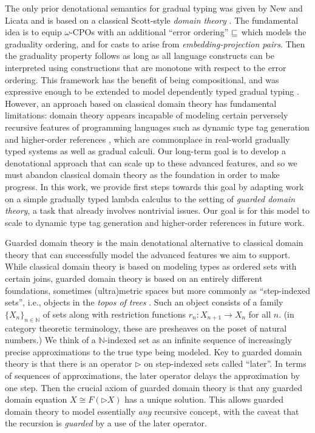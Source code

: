 The only prior denotational semantics for gradual typing was given by
New and Licata and is based on a classical Scott-style \emph{domain
theory} \cite{new-licata18}. The fundamental idea is to equip
$\omega$-CPOs with an additional ``error ordering'' $\sqsubseteq$ which
models the graduality ordering, and for casts to arise from
\emph{embedding-projection pairs}. Then the graduality property
follows as long as all language constructs can be interpreted using
constructions that are monotone with respect to the error ordering.
%
This framework has the benefit of being compositional, and was
expressive enough to be extended to model dependently typed gradual
typing \cite{gradualizing-cic}.
%
However, an approach based on classical domain theory has fundamental
limitations: domain theory appears incapable of modeling certain perversely
recursive features of programming languages such as dynamic type tag
generation and higher-order references \cite{Birkedal-Stovring-Thamsborg-2009}, which are commonplace in
real-world gradually typed systems as well as gradual calculi.
%
Our long-term goal is to develop a denotational approach that can
scale up to these advanced features, and so we must abandon classical
domain theory as the foundation in order to make progress. In this
work, we provide first steps towards this goal by adapting work on a
simple gradually typed lambda calculus to the setting of \emph{guarded domain
theory}, a task that already involves nontrivial issues.
Our goal is for this model to scale to dynamic type tag
generation and higher-order references in future work.

Guarded domain theory is the main denotational alternative to
classical domain theory that can successfully model the advanced
features we aim to support. While classical domain theory is based on modeling types as
ordered sets with certain joins, guarded domain theory is based on an
entirely different foundations, sometimes (ultra)metric spaces but
more commonly as ``step-indexed sets'', i.e., objects in the
\emph{topos of trees}
\cite{birkedal-mogelberg-schwinghammer-stovring2011}.  Such an object
consists of a family $\{X_n\}_{n \in \mathbb{N}}$ of sets along with
restriction functions $r_n : X_{n+1} \to X_n$ for all $n$.  (in
category theoretic terminology, these are presheaves on the poset of
natural numbers.)  We think of a $\mathbb{N}$-indexed set as an
infinite sequence of increasingly precise approximations to the true
type being modeled.
%
Key to guarded domain theory is that there is an operator
$\triangleright$ on step-indexed sets called ``later''. In terms of
sequences of approximations, the later operator delays the
approximation by one step. Then the crucial axiom of guarded domain
theory is that any guarded domain equation $X \cong F(\triangleright
X)$ has a unique solution. This allows guarded domain theory to model
essentially \emph{any} recursive concept, with the caveat that the
recursion is \emph{guarded} by a use of the later operator.

